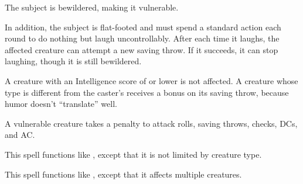 \spellrng{\rngclose}
\spelldur{\durshort}
\begin{spelleffect}
  The subject is bewildered, making it vulnerable.
\end{spelleffect}
\begin{spellblood}
  In addition, the subject is flat-footed and must spend a standard action each round to do nothing but laugh uncontrollably. After each time it laughs, the affected creature can attempt a new saving throw. If it succeeds, it can stop laughing, though it is still bewildered.
\end{spellblood}
\begin{spellnotes}
  A creature with an Intelligence score of  or lower is not affected. A creature whose type is different from the caster's receives a  bonus on its saving throw, because humor doesn't ``translate'' well.
\end{spellnotes}
\begin{spellnotes}
  A vulnerable creature takes a  penalty to attack rolls, saving throws, checks, DCs, and AC.
\end{spellnotes}

\begin{spelleffect}
  This spell functions like , except that it is not limited by creature type.
\end{spelleffect}

\begin{spelleffect}
  This spell functions like , except that it affects multiple creatures.
\end{spelleffect}

